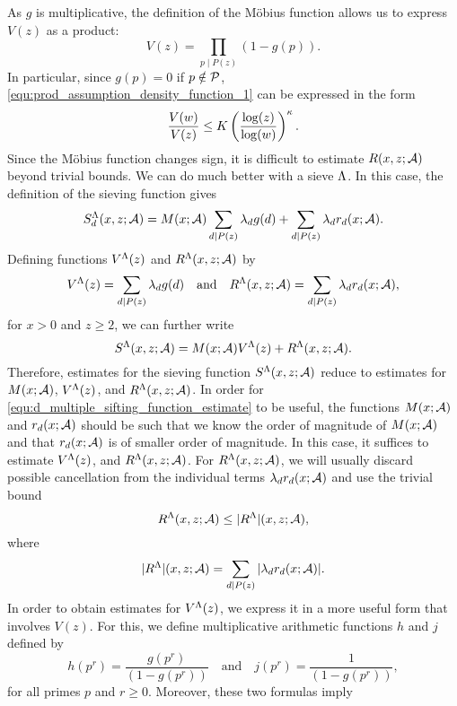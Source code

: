 \documentclass[12pt,oneside]{book}
\begin{document}
    As $g$ is multiplicative, the definition of the M\"obius function allows us to express $V(z)$ as a product:
    \begin{equation}\label{equ:V_product_formula}
      V(z) = \prod_{p \mid P(z)}(1-g(p)).
    \end{equation}
    In particular, since $g(p) = 0$ if $p \notin \mathcal{P}$, \cref{equ:prod_assumption_density_function_1} can be expressed in the form
    \begin{equation}\label{equ:prod_assumption_density_function_2}
      \frac{V(w)}{V(z)} \le K\left(\frac{\log(z)}{\log(w)}\right)^{\kappa}.
    \end{equation}
    Since the M\"obius function changes sign, it is difficult to estimate $R(x,z;\mathcal{A})$ beyond trivial bounds. We can do much better with a sieve $\Lambda$. In this case, the definition of the sieving function gives
    \[
      S_{d}^{\Lambda}(x,z;\mathcal{A}) = M(x;\mathcal{A})\sum_{d \mid P(z)}\lambda_{d}g(d)+\sum_{d \mid P(z)}\lambda_{d}r_{d}(x;\mathcal{A}).
    \]
    Defining functions $V^{\Lambda}(z)$ and $R^{\Lambda}(x,z;\mathcal{A})$ by
     \[
      V^{\Lambda}(z) = \sum_{d \mid P(z)}\lambda_{d}g(d) \quad \text{and} \quad R^{\Lambda}(x,z;\mathcal{A}) = \sum_{d \mid P(z)}\lambda_{d}r_{d}(x;\mathcal{A}),
    \]
    for $x > 0$ and $z \ge 2$, we can further write
    \begin{equation}\label{equ:estimate_for_sieving_function}
      S^{\Lambda}(x,z;\mathcal{A}) = M(x;\mathcal{A})V^{\Lambda}(z)+R^{\Lambda}(x,z;\mathcal{A}).
    \end{equation}
    Therefore, estimates for the sieving function $S^{\Lambda}(x,z;\mathcal{A})$ reduce to estimates for $M(x;\mathcal{A})$, $V^{\Lambda}(z)$, and $R^{\Lambda}(x,z;\mathcal{A})$. In order for \cref{equ:d_multiple_sifting_function_estimate} to be useful, the functions $M(x;\mathcal{A})$ and $r_{d}(x;\mathcal{A})$ should be such that we know the order of magnitude of $M(x;\mathcal{A})$ and that $r_{d}(x;\mathcal{A})$ is of smaller order of magnitude. In this case, it suffices to estimate $V^{\Lambda}(z)$, and $R^{\Lambda}(x,z;\mathcal{A})$. For $R^{\Lambda}(x,z;\mathcal{A})$, we will usually discard possible cancellation from the individual terms $\lambda_{d}r_{d}(x;\mathcal{A})$ and use the trivial bound
    \[
      R^{\Lambda}(x,z;\mathcal{A}) \le |R^{\Lambda}|(x,z;\mathcal{A}),
    \]
    where
    \[
      |R^{\Lambda}|(x,z;\mathcal{A}) = \sum_{d \mid P(z)}|\lambda_{d}r_{d}(x;\mathcal{A})|.
    \]
    In order to obtain estimates for $V^{\Lambda}(z)$, we express it in a more useful form that involves $V(z)$. For this, we define multiplicative arithmetic functions $h$ and $j$ defined by
    \[
      h(p^{r}) = \frac{g(p^{r})}{(1-g(p^{r}))} \quad \text{and} \quad j(p^{r}) = \frac{1}{(1-g(p^{r}))},
    \]
    for all primes $p$ and $r \ge 0$. Moreover, these two formulas imply
\end{document}
